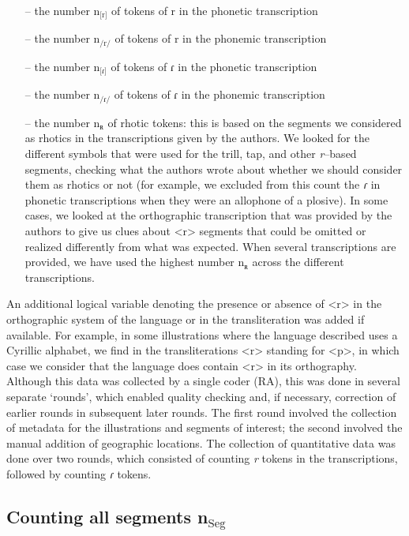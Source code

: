 \begin{itemize}
	\item[–] the number n$_\textrm{[r]}$ of tokens of r in the phonetic transcription
	\item[–] the number n$_\textrm{/r/}$ of tokens of r in the phonemic transcription
	\item[–] the number n$_\textrm{[ɾ]}$ of tokens of ɾ in the phonetic transcription
	\item[–] the number n$_\textrm{/ɾ/}$ of tokens of ɾ in the phonemic transcription
	\item[–] the  number n$_\textrm{ʀ}$ of rhotic tokens: this is based on the segments we considered as rhotics in the transcriptions given by the authors. We looked for the different symbols that were used for the trill, tap, and other \textit{r}–based segments, checking what the authors wrote about whether we should consider them as rhotics or not (for example, we excluded from this count the \textit{ɾ} in phonetic transcriptions when they were an allophone of a plosive). In some cases, we looked at the orthographic transcription that was provided by the authors to give us clues about <r> segments that could be omitted or realized differently from what was expected. When several transcriptions are provided, we have used the highest number n$_\textrm{ʀ}$ across the different transcriptions.
\end{itemize} 

An additional logical variable denoting the presence or absence of <r> in the orthographic system of the language or in the transliteration was added if available. For example, in some illustrations where the language described uses a Cyrillic alphabet, we find in the transliterations <r> standing for <p>, in which case we consider that the language does contain <r> in its orthography. \\

Although this data was collected by a single coder (RA), this was done in several separate ‘rounds’, which enabled quality checking and, if necessary, correction of earlier rounds in subsequent later rounds. The first round involved the collection of metadata for the illustrations and segments of interest; the second involved the manual addition of geographic locations. The collection of quantitative data was done over two rounds, which consisted of counting \textit{r} tokens in the transcriptions, followed by counting \textit{ɾ} tokens.

\subsection{Counting all segments n$_\textrm{Seg}$}

